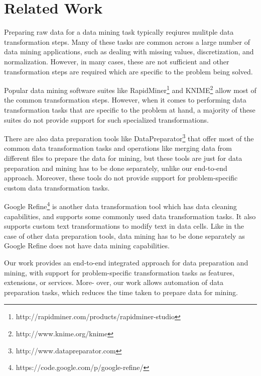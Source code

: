 \section{Related Work}

Preparing raw data for a data mining task typically reqiures mulitple data transformation steps. Many of these tasks are common across a large number of data mining applications, such as dealing with missing values, discretization, and normalization. However, in many cases, these are not sufficient and other transformation steps are required which are specific to the problem being solved.

Popular data mining software suites like RapidMiner\footnote{http://rapidminer.com/products/rapidminer-studio} and KNIME\footnote{http://www.knime.org/knime} allow most of the common transformation steps. However, when it comes to performing data transformation tasks that are specific to the problem at hand, a majority of these suites do not provide support for such specialized transformations.

There are also data preparation tools like DataPreparator\footnote{http://www.datapreparator.com} that offer most of the common data transformation tasks and operations like merging data from different files to prepare the data for mining, but these tools are just for data preparation and mining has to be done separately, unlike our end-to-end approach. Moreover, these tools do not provide support for problem-specific custom data transformation tasks.

Google Refine\footnote{https://code.google.com/p/google-refine/} is another data transformation tool which has data cleaning capabilities, and supports some commonly used data transformation tasks. It also supports custom text transformations to modify text in data cells. Like in the case of other data preparation tools, data mining has to be done separately as Google Refine does not have data mining capabilities.

Our work provides an end-to-end integrated approach for data preparation and mining, with support for problem-specific transformation tasks as features, extensions, or services. More- over, our work allows automation of data preparation tasks, which reduces the time taken to prepare data for mining.